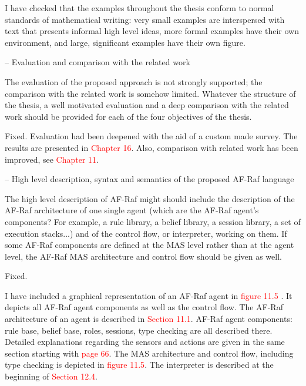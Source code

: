 \documentclass{article}
\newcommand*\R[1]{\textcolor{red}{#1}} %
\newenvironment{them}{\noindent\begingroup\color{blue}}{\endgroup\par}
\begin{document}
I have checked that the examples throughout the thesis conform to normal
standards of mathematical writing: very small examples are interspersed with
text that presents informal high level ideas, more formal examples have their
own environment, and large, significant examples have their own figure.

\begin{them}

-- Evaluation and comparison with the related work

The evaluation of the proposed approach is not strongly supported; the
comparison with the related work is somehow limited. Whatever the structure of
the thesis, a well motivated evaluation and a deep comparison with the related
work should be provided for each of the four objectives of the thesis.

\end{them}
Fixed. Evaluation had been deepened with the aid of a custom made survey. The
results are presented in \R{Chapter 16}. Also, comparison with related work has been improved, see \R{Chapter 11}.

\begin{them}

-- High level description, syntax and semantics of the proposed AF-Raf language

The high level description of AF-Raf might should include the description of
the AF-Raf architecture of one single agent (which are the AF-Raf agent's
components? For example, a rule library, a belief library, a session library, a
set of execution stacks...) and of the control flow, or interpreter, working on
them. If some AF-Raf components are defined at the MAS level rather than at the
agent level, the AF-Raf MAS architecture and control flow should be given as
well.

\end{them}
Fixed.

I have included a graphical representation of an AF-Raf agent in \R{figure 11.5
}. It depicts all AF-Raf agent components as well as the control flow. The
AF-Raf architecture of an agent is described in \R{Section 11.1}. AF-Raf agent
components: rule base, belief base, roles, sessions, type checking are all
described there. Detailed explanations regarding the sensors and actions are
given in the same section starting with \R{page 66}. The MAS architecture and
control flow, including type checking is depicted in \R{figure 11.5}. The
interpreter is described at the beginning of \R{Section 12.4}. 
\end{document}
